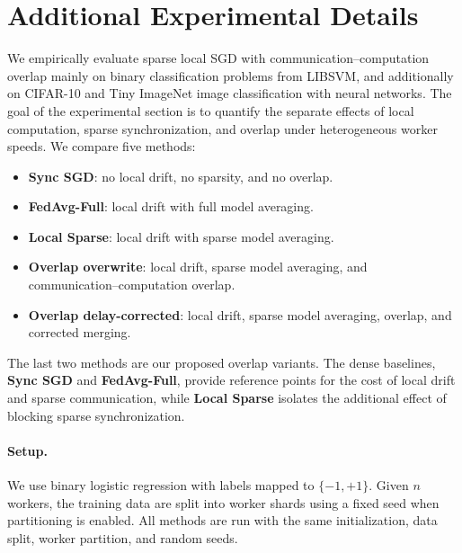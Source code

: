 \documentclass{article}
\theoremstyle{plain}
\theoremstyle{definition}
\begin{document}
\section{Additional Experimental Details}
\label{sec:appendix-experiments}

We empirically evaluate sparse local SGD with communication--computation overlap mainly on binary classification problems from LIBSVM, and additionally on CIFAR-10 and Tiny ImageNet image classification with neural networks. 
The goal of the experimental section is to quantify the separate effects of local computation, sparse synchronization, and overlap under heterogeneous worker speeds. 
We compare five methods:
\begin{itemize}
    \item \textbf{Sync SGD}: no local drift, no sparsity, and no overlap.
    \item \textbf{FedAvg-Full}: local drift with full model averaging.
    \item \textbf{Local Sparse}: local drift with sparse model averaging.
    \item \textbf{Overlap overwrite}: local drift, sparse model averaging, and communication--computation overlap.
    \item \textbf{Overlap delay-corrected}: local drift, sparse model averaging, overlap, and corrected merging.
\end{itemize}
The last two methods are our proposed overlap variants. 
The dense baselines, \textbf{Sync SGD} and \textbf{FedAvg-Full}, provide reference points for the cost of local drift and sparse communication, while \textbf{Local Sparse} isolates the additional effect of blocking sparse synchronization.

\paragraph{Setup.}
We use binary logistic regression with labels mapped to $\{-1,+1\}$. 
Given $n$ workers, the training data are split into worker shards using a fixed seed when partitioning is enabled. 
All methods are run with the same initialization, data split, worker partition, and random seeds.
\end{document}
